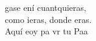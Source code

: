 \begin{cancion}[Hágase][Ixcís]%
	gase ení cuantquieras, \\
	como ieras, donde eras.\\
	Aquí eoy pa vr tu Paa\\
\end{cancion}%
